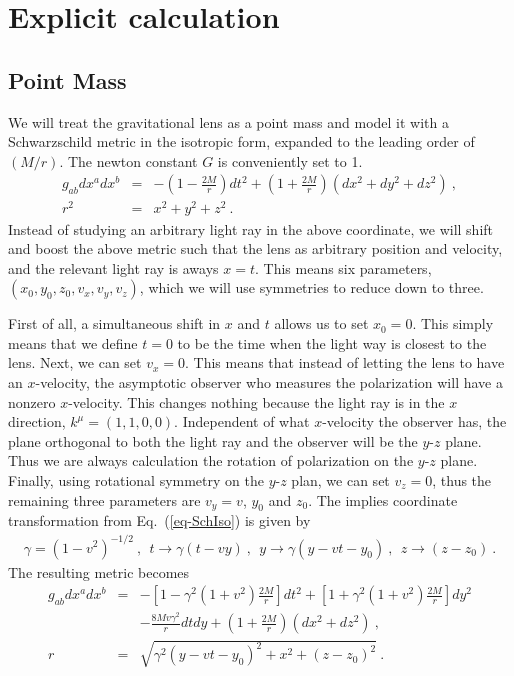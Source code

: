 \documentclass[aps,showpacs,onecolumn,floats,prd,superscriptaddress,nofootinbib]{revtex4}
\begin{document}
\section{Explicit calculation}
\label{sec-Sch}

\subsection{Point Mass}

We will treat the gravitational lens as a point mass and model it with a Schwarzschild metric in the isotropic form, expanded to the leading order of $(M/r)$. 
The newton constant $G$ is conveniently set to 1.
\begin{eqnarray}
g_{ab}dx^adx^b &=& -\left(1-\frac{2M}{r}\right)dt^2 + \left(1+\frac{2M}{r}\right)\left(dx^2+dy^2+dz^2\right)~, \\
r^2 &=& x^2 + y^2 + z^2~.
\label{eq-SchIso}
\end{eqnarray}
Instead of studying an arbitrary light ray in the above coordinate, we will shift and boost the above metric such that the lens as arbitrary position and velocity, and the relevant light ray is aways $x=t$.
This means six parameters, $(x_0,y_0,z_0,v_x,v_y,v_z)$, which we will use symmetries to reduce down to three.

First of all, a simultaneous shift in $x$ and $t$ allows us to set $x_0=0$. This simply means that we define $t=0$ to be the time when the light way is closest to the lens.
Next, we can set $v_x=0$. 
This means that instead of letting the lens to have an $x$-velocity, the asymptotic observer who measures the polarization will have a nonzero $x$-velocity. 
This changes nothing because the light ray is in the $x$ direction, $k^\mu = (1,1,0,0)$.
Independent of what $x$-velocity the observer has, the plane orthogonal to both the light ray and the observer will be the $y$-$z$ plane.
Thus we are always calculation the rotation of polarization on the $y$-$z$ plane.
Finally, using rotational symmetry on the $y$-$z$ plan, we can set $v_z=0$, thus the remaining three parameters are $v_y=v$, $y_0$ and $z_0$. The implies coordinate transformation from Eq.~(\ref{eq-SchIso}) is given by
\begin{eqnarray}
\gamma = (1-v^2)^{-1/2}~, \ \ t \rightarrow \gamma(t-vy)~, \ \ y\rightarrow \gamma(y-vt-y_0)~, \ \
z\rightarrow (z-z_0)~.
\end{eqnarray}
The resulting metric becomes
\begin{eqnarray}
g_{ab}dx^adx^b &=& -\left[1-\gamma^2(1+v^2)\frac{2M}{r}\right]dt^2   
+ \left[1+\gamma^2(1+v^2)\frac{2M}{r}\right]dy^2 
\label{eq-metric}
\\ \nonumber
& & - \frac{8Mv\gamma^2}{r}dtdy + \left(1+\frac{2M}{r}\right)(dx^2+dz^2)~, \\
r &=& \sqrt{ \gamma^2(y-vt-y_0)^2 + x^2 + (z-z_0)^2 }~.
\end{eqnarray}
\end{document}
